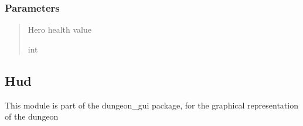 \documentclass[letterpaper,10pt,english]{sphinxmanual}
\begin{document}
\begin{fulllineitems}
\begin{fulllineitems}
\subsubsection{Parameters}
\label{\detokenize{api_reference/dungeon_gui/health_bar:id1}}\begin{quote}\begin{description}
\sphinxAtStartPar
Hero health value

\sphinxAtStartPar
int

\end{description}\end{quote}

\end{fulllineitems}


\end{fulllineitems}


\sphinxstepscope


\subsection{Hud}
\label{\detokenize{api_reference/dungeon_gui/hud:module-hud}}\label{\detokenize{api_reference/dungeon_gui/hud:hud}}\label{\detokenize{api_reference/dungeon_gui/hud::doc}}
\sphinxAtStartPar
This module is part of the dungeon\_gui package, for the graphical representation of the dungeon
\end{document}
